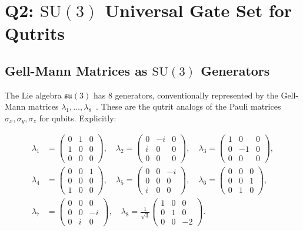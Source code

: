 \documentclass[11pt,letterpaper]{article}
\newcommand{\SU}{\mathrm{SU}}
\begin{document}
\section{Q2: $\SU(3)$ Universal Gate Set for Qutrits}
\label{sec:Q2}

\subsection{Gell-Mann Matrices as $\SU(3)$ Generators}

The Lie algebra $\mathfrak{su}(3)$ has 8 generators, conventionally represented by the
Gell-Mann matrices $\lambda_1, \ldots, \lambda_8$~\cite{GellMann}. These are the qutrit
analogs of the Pauli matrices $\sigma_x, \sigma_y, \sigma_z$ for qubits. Explicitly:

\begin{align}
  \lambda_1 &= \begin{pmatrix} 0 & 1 & 0 \\ 1 & 0 & 0 \\ 0 & 0 & 0 \end{pmatrix}, \quad
  \lambda_2 = \begin{pmatrix} 0 & -i & 0 \\ i & 0 & 0 \\ 0 & 0 & 0 \end{pmatrix}, \quad
  \lambda_3 = \begin{pmatrix} 1 & 0 & 0 \\ 0 & -1 & 0 \\ 0 & 0 & 0 \end{pmatrix}, \nonumber \\
  \lambda_4 &= \begin{pmatrix} 0 & 0 & 1 \\ 0 & 0 & 0 \\ 1 & 0 & 0 \end{pmatrix}, \quad
  \lambda_5 = \begin{pmatrix} 0 & 0 & -i \\ 0 & 0 & 0 \\ i & 0 & 0 \end{pmatrix}, \quad
  \lambda_6 = \begin{pmatrix} 0 & 0 & 0 \\ 0 & 0 & 1 \\ 0 & 1 & 0 \end{pmatrix}, \nonumber \\
  \lambda_7 &= \begin{pmatrix} 0 & 0 & 0 \\ 0 & 0 & -i \\ 0 & i & 0 \end{pmatrix}, \quad
  \lambda_8 = \frac{1}{\sqrt{3}} \begin{pmatrix} 1 & 0 & 0 \\ 0 & 1 & 0 \\ 0 & 0 & -2 \end{pmatrix}.
  \label{eq:gellmann}
\end{align}
\end{document}
